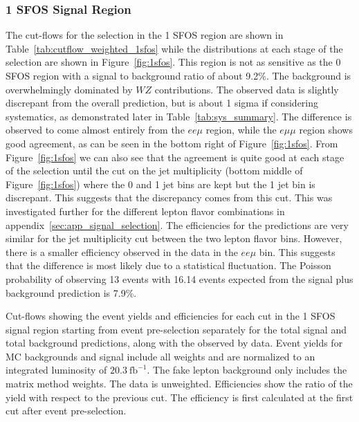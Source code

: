 \subsubsection{1 SFOS Signal Region}
The cut-flows for the selection in the 1 SFOS region are shown in Table~\ref{tab:cutflow_weighted_1sfos}
while the distributions at each stage of the selection are shown in Figure~\ref{fig:1sfos}.
This region is not as sensitive as the 0 SFOS region with a signal to background ratio of about 9.2\%.
The background is overwhelmingly dominated by $WZ$ contributions. The observed data is slightly discrepant
from the overall prediction, but is about 1 sigma if considering systematics, as demonstrated later in Table~\ref{tab:sys_summary}.
The difference is observed to come almost entirely from the $ee\mu$ region, while the $e\mu\mu$ region shows good agreement, as can
be seen in the bottom right of Figure~\ref{fig:1sfos}. From Figure~\ref{fig:1sfos} we can also see that the agreement
is quite good at each stage of the selection until the cut on the jet multiplicity (bottom middle of Figure~\ref{fig:1sfos}) where the 0 and 1 jet
bins are kept but the 1 jet bin is discrepant.  This suggests that the discrepancy comes from this cut.  This was investigated further
for the different lepton flavor combinations in appendix~\ref{sec:app_signal_selection}.  The efficiencies for the predictions
are very similar for the jet multiplicity cut between the two lepton flavor bins. However, there is a smaller efficiency observed
in the data in the $ee\mu$ bin.  This suggests that the difference is most likely due to a statistical fluctuation.
The Poisson probability of observing 13 events with 16.14 events expected from the signal plus background prediction is 7.9\%.

\begin{table}[ht!]
\small
\centering

\caption{Cut-flows showing the event yields and efficiencies for each cut in the 1 SFOS signal region
starting from event pre-selection separately for the total signal and total background predictions, along with the observed by data. 
Event yields for MC backgrounds and signal include all weights and are normalized to an integrated luminosity of $20.3~\mathrm{fb}^{-1}$.  
The fake lepton background only includes the matrix method weights.  The data is unweighted.
Efficiencies show the ratio of the yield with respect
to the previous cut.  The efficiency is first calculated at the first cut after event pre-selection.  }
\label{tab:cutflow_weighted_1sfos}
\end{table}

